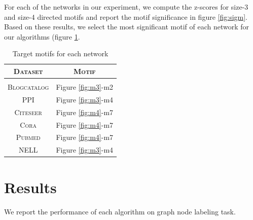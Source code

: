 \documentclass{article}
\theoremstyle{definition}
\begin{document}
For each of the networks in our experiment, we compute the z-scores for
size-3 and size-4 directed motifs and report the motif significance
in figure \ref{fig:sigm}. Based on these results, 
we select the most significant motif of each network for our algorithms
(figure \ref{t:motifs}. 

\begin{table}
\centering
\begin{tabular}{c c}
\textsc{Dataset} & \textsc{Motif} \\
\hline \\
\textsc{Blogcatalog} & Figure \ref{fig:m3}-m2 \\
\textsc{PPI} & Figure \ref{fig:m3}-m4 \\
\textsc{Citeseer} & Figure \ref{fig:m4}-m7 \\
\textsc{Cora} & Figure \ref{fig:m4}-m7 \\
\textsc{Pubmed} & Figure \ref{fig:m4}-m7 \\
\textsc{NELL} & Figure \ref{fig:m3}-m4 \\
\end{tabular}%
\caption{Target motifs for each network}
\label{t:motifs}
\end{table}

\section{Results}

We report the performance of each algorithm on graph node
labeling task.

\begin{table}[H]
\centering
{}
\caption{F1-macro score for multiclass labeling}
\label{t:re}
\end{table}
\end{document}
